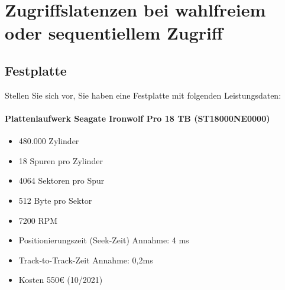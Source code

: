 \section{Zugriffslatenzen bei wahlfreiem oder sequentiellem Zugriff}

\subsection{Festplatte}
\label{ZugriffFestplatten}
Stellen Sie sich vor, Sie haben eine Festplatte mit folgenden Leistungsdaten:
\paragraph{Plattenlaufwerk Seagate Ironwolf Pro 18 TB (ST18000NE0000)}
\begin{itemize}
	\item 480.000 Zylinder
	\item 18 Spuren pro Zylinder
	\item 4064 Sektoren pro Spur
	\item 512 Byte pro Sektor
	\item 7200 RPM
	\item Positionierungszeit (Seek-Zeit) Annahme: 4 ms
	\item Track-to-Track-Zeit Annahme: 0,2ms
	\item Kosten 550€ (10/2021)
\end{itemize}

